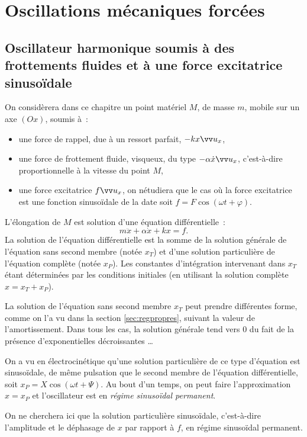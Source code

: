 \chapter{Oscillations mécaniques forcées}
\minitoc
\minilof
\minilot

\section{Oscillateur harmonique soumis à des frottements fluides et à une force 
excitatrice sinusoïdale}
On considèrera dans ce chapitre un point matériel \(M\), de masse \(m\), mobile 
sur un axe \((Ox)\), soumis à~:
\begin{itemize}
  \item une force de rappel, due à un ressort parfait, \(-kx \ux\),
  \item une force de frottement fluide, visqueux, du type \(-\alpha \dot{x} 
    \ux\), c'est-à-dire proportionnelle à la vitesse du point \(M\),
  \item une force excitatrice \(f \ux\), on nétudiera que le cas où la force 
    excitatrice est une fonction sinusoïdale de la date soit \(f = F\cos(\omega 
    t + \varphi)\).
\end{itemize}
L'élongation de \(M\) est solution d'une équation différentielle~:
\begin{equation}
  m\ddot{x}+\alpha\dot{x}+kx = f.
\end{equation}
La solution de l'équation différentielle est la somme de la solution générale de 
l'équation sans second membre (notée \(x_T\)) et d'une solution particulière de 
l'équation complète (notée \(x_P\)). Les constantes d'intégration intervenant 
dans \(x_T\) étant déterminées par les conditions initiales (en utilisant la 
solution complète \(x = x_T+x_P\)). 

La solution de l'équation sans second membre \(x_T\) peut prendre différentes 
forme, comme on l'a vu dans la section \ref{sec:regpropres}, suivant la valeur 
de l'amortissement. Dans tous les cas, la solution générale tend vers 0 du fait 
de la présence d'exponentielles décroissantes \ldots

On a vu en électrocinétique qu'une solution particulière de ce type d'équation 
est sinusoïdale, de même pulsation que le second membre de l'équation 
différentielle, soit \(x_P = X\cos(\omega t + \Psi)\). Au bout d'un temps, on 
peut faire l'approximation \(x = x_P\) et l'oscillateur est en \emph{régime 
sinusoïdal permanent}. 

On ne cherchera ici que la solution particulière sinusoïdale, c'est-à-dire 
l'amplitude et le déphasage de \(x\) par rapport à \(f\), en régime sinusoïdal 
permanent.

